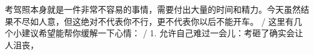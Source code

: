 \begin{multicols}{2}
考\allowbreak{}驾\allowbreak{}照\allowbreak{}本\allowbreak{}身\allowbreak{}就\allowbreak{}是\allowbreak{}一\allowbreak{}件\allowbreak{}非\allowbreak{}\allowbreak{}常\allowbreak{}不\allowbreak{}容\allowbreak{}易\allowbreak{}的\allowbreak{}事\allowbreak{}情\allowbreak{}，\allowbreak{}需\allowbreak{}要\allowbreak{}\allowbreak{}付\allowbreak{}出\allowbreak{}大\allowbreak{}量\allowbreak{}的\allowbreak{}时\allowbreak{}间\allowbreak{}和\allowbreak{}精\allowbreak{}力\allowbreak{}\allowbreak{}。\allowbreak{}今\allowbreak{}天\allowbreak{}虽\allowbreak{}然\allowbreak{}结\allowbreak{}果\allowbreak{}不\allowbreak{}尽\allowbreak{}如\allowbreak{}\allowbreak{}人\allowbreak{}意\allowbreak{}，\allowbreak{}但\allowbreak{}这\allowbreak{}绝\allowbreak{}对\allowbreak{}不\allowbreak{}代\allowbreak{}表\allowbreak{}\allowbreak{}你\allowbreak{}不\allowbreak{}行\allowbreak{}，\allowbreak{}更\allowbreak{}不\allowbreak{}代\allowbreak{}表\allowbreak{}你\allowbreak{}以\allowbreak{}\allowbreak{}后\allowbreak{}不\allowbreak{}能\allowbreak{}开\allowbreak{}车\allowbreak{}。\allowbreak{} / 这\allowbreak{}里\allowbreak{}有\allowbreak{}几\allowbreak{}个\allowbreak{}小\allowbreak{}建\allowbreak{}议\allowbreak{}希\allowbreak{}望\allowbreak{}能\allowbreak{}帮\allowbreak{}你\allowbreak{}缓\allowbreak{}解\allowbreak{}一\allowbreak{}下\allowbreak{}心\allowbreak{}情\allowbreak{}：\allowbreak{} / 1. 允\allowbreak{}许\allowbreak{}自\allowbreak{}己\allowbreak{}难\allowbreak{}过\allowbreak{}一\allowbreak{}会\allowbreak{}儿\allowbreak{}：\allowbreak{}考\allowbreak{}砸\allowbreak{}了\allowbreak{}确\allowbreak{}实\allowbreak{}会\allowbreak{}让\allowbreak{}人\allowbreak{}沮\allowbreak{}丧\allowbreak{}，\allowbreak{}\par\medskip

\end{multicols}
